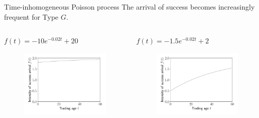 \documentclass{beamer}
\begin{document}
\begin{frame}[allowframebreaks]{Time-inhomogeneous Poisson process}
The arrival of success becomes increasingly frequent for Type $G$.

	\begin{columns}[t]
		\begin{column}{0.49\textwidth}
			\begin{block}{$f(t)=-10e^{-0.02t}+20$}
				\begin{figure}
					\includegraphics[width=\linewidth]{figures/funcf2}
				\end{figure}
			\end{block}
		\end{column}

	\begin{column}{0.49\textwidth}
					\begin{block}{$f(t)=-1.5e^{-0.02t}+2$}
			\begin{figure}
				\includegraphics[width=\linewidth]{figures/funcf1}
			\end{figure}
		\end{block}
	\end{column}
\end{columns}


\end{frame}
\end{document}
